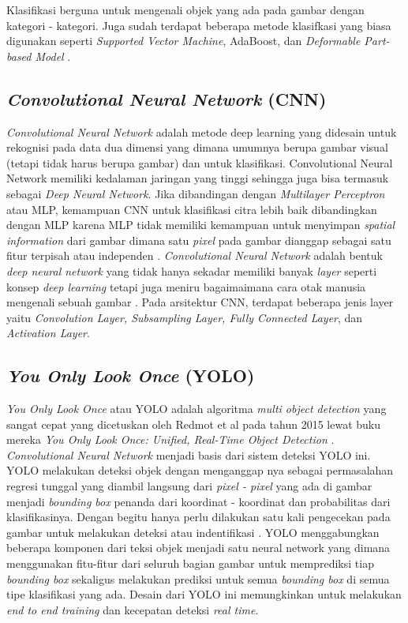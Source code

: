 \par Klasifikasi berguna untuk mengenali objek yang ada pada gambar dengan kategori - kategori. Juga sudah terdapat beberapa metode
klasifkasi yang biasa digunakan seperti \emph{Supported Vector Machine}, AdaBoost, dan \emph{Deformable Part-based Model} \cite{zhao2019object}.

\subsection{\emph{Convolutional Neural Network} (CNN)}
\label{sec:convolutionalneuralnetwork}

\par \emph{Convolutional Neural Network} adalah metode deep learning yang didesain untuk rekognisi pada data dua
dimensi yang dimana umumnya berupa gambar visual (tetapi tidak harus berupa gambar) dan untuk klasifikasi.
Convolutional Neural Network memiliki kedalaman jaringan yang tinggi sehingga juga bisa termasuk sebagai \emph{Deep Neural Network}.
Jika dibandingan dengan \emph{Multilayer Perceptron} atau MLP, kemampuan CNN untuk klasifikasi citra lebih baik dibandingkan dengan MLP karena MLP tidak memiliki
kemampuan untuk menyimpan \emph{spatial information} dari gambar dimana satu \emph{pixel} pada gambar dianggap sebagai satu fitur
terpisah atau independen \cite{putra2016klasifikasi}. \emph{Convolutional Neural Network} adalah bentuk \emph{deep neural network} yang tidak hanya
sekadar memiliki banyak \emph{layer} seperti konsep \emph{deep learning} tetapi juga meniru bagaimaimana cara otak manusia mengenali sebuah gambar \cite{kim2017convolutional}. Pada arsitektur CNN, terdapat beberapa jenis layer yaitu \emph{Convolution Layer, Subsampling Layer,
  Fully Connected Layer}, dan \emph{Activation Layer}.

\subsection{\emph{You Only Look Once} (YOLO)}
\label{sec:youonlylookone}

\emph{You Only Look Once} atau YOLO adalah algoritma \emph{multi object detection} yang sangat cepat yang dicetuskan oleh Redmot et al pada tahun 2015 lewat buku mereka \emph{You Only Look Once: Unified, Real-Time Object Detection} \cite{redmon2016you}. \emph{Convolutional Neural Network} menjadi basis dari sistem deteksi YOLO ini. YOLO melakukan deteksi objek dengan menganggap nya sebagai permasalahan regresi tunggal yang diambil langsung dari \emph{pixel - pixel} yang ada di gambar menjadi \emph{bounding box} penanda dari koordinat - koordinat dan probabilitas dari klasifikasinya. Dengan begitu hanya perlu dilakukan satu kali pengecekan pada gambar untuk melakukan deteksi atau indentifikasi \cite{redmon2016you}. YOLO menggabungkan beberapa komponen dari teksi objek menjadi satu neural network yang dimana menggunakan fitu-fitur dari seluruh bagian gambar untuk memprediksi tiap \emph{bounding box} sekaligus melakukan prediksi untuk semua \emph{bounding box} di semua tipe klasifikasi yang ada. Desain dari YOLO ini memungkinkan untuk melakukan \emph{end to end training} dan kecepatan deteksi \emph{real time}.

